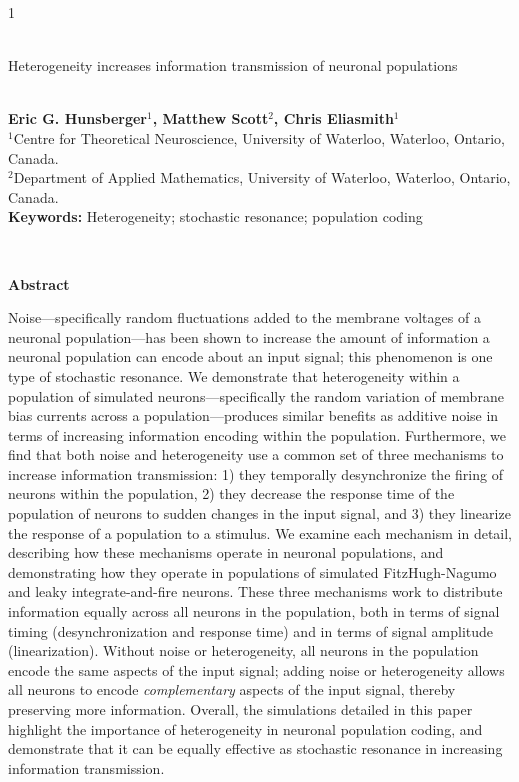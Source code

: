 \documentclass[12pt]{article}
\begin{document}
\hspace{13.9cm}1

\ \vspace{20mm}\\

{\LARGE Heterogeneity increases information transmission of neuronal populations}

\ \\
{\bf \large Eric G. Hunsberger$^{\displaystyle 1}$, Matthew Scott$^{\displaystyle 2}$, Chris Eliasmith$^{\displaystyle 1}$}\\
{$^{\displaystyle 1}$Centre for Theoretical Neuroscience, University of Waterloo, Waterloo, Ontario, Canada.}\\
{$^{\displaystyle 2}$Department of Applied Mathematics, University of Waterloo, Waterloo, Ontario, Canada.}\\
%

{\bf Keywords:} Heterogeneity; stochastic resonance; population coding

\thispagestyle{empty}
%
\ \vspace{-0mm}\\
%
\begin{center} {\bf Abstract} \end{center}
Noise---specifically random fluctuations added to the membrane voltages of a neuronal population---has been shown to increase the amount of information a neuronal population can encode about an input signal; this phenomenon is one type of stochastic resonance. We demonstrate that heterogeneity within a population of simulated neurons---specifically the random variation of membrane bias currents across a population---produces similar benefits as additive noise in terms of increasing information encoding within the population. Furthermore, we find that both noise and heterogeneity use a common set of three mechanisms to increase information transmission: 1) they temporally desynchronize the firing of neurons within the population, 2) they decrease the response time of the population of neurons to sudden changes in the input signal, and 3) they linearize the response of a population to a stimulus. We examine each mechanism in detail, describing how these mechanisms operate in neuronal populations, and demonstrating how they operate in populations of simulated FitzHugh-Nagumo and leaky integrate-and-fire neurons. These three mechanisms work to distribute information equally across all neurons in the population, both in terms of signal timing (desynchronization and response time) and in terms of signal amplitude (linearization). Without noise or heterogeneity, all neurons in the population encode the same aspects of the input signal; adding noise or heterogeneity allows all neurons to encode \emph{complementary} aspects of the input signal, thereby preserving more information. Overall, the simulations detailed in this paper highlight the importance of heterogeneity in neuronal population coding, and demonstrate that it can be equally effective as stochastic resonance in increasing information transmission. 
\end{document}
